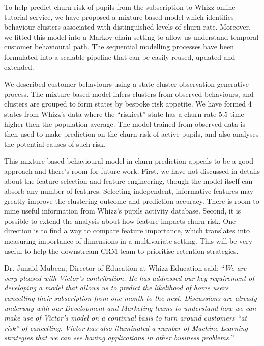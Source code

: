 \documentclass[english,a4,oneside,9pt]{extarticle}
\begin{document}
To help predict churn risk of pupils from the subscription to Whizz online tutorial service, we have proposed a mixture based model which identifies behaviour clusters associated with distinguished levels of churn rate. Moreover, we fitted this model into a Markov chain setting to allow us understand temporal customer behavioural path. The sequential modelling processes have been formulated into a scalable pipeline that can be easily reused, updated and extended.

We described customer behaviours using a state-cluster-observation generative process. The mixture based model infers clusters from observed behaviours, and clusters are grouped to form states by bespoke risk appetite. We have formed 4 states from Whizz's data where the ``riskiest'' state has a churn rate 5.5 time higher then the population average. The model trained from observed data is then used to make prediction on the churn risk of active pupils, and also analyses the potential causes of such risk.

This mixture based behavioural model in churn prediction appeals to be a good approach and there's room for future work. First, we have not discussed in details about the feature selection and feature engineering, though the model itself can absorb any number of features. Selecting independent, informative features may greatly improve the clustering outcome and prediction accuracy. There is room to mine useful information from Whizz's pupils activity database. Second, it is possible to extend the analysis about how feature impacts churn risk. One direction is to find a way to compare feature importance, which translates into measuring importance of dimensions in a multivariate setting. This will be very useful to help the downstream CRM team to prioritise retention strategies.  

Dr. Junaid Mubeen, Director of Education at Whizz Education said: ``\emph{We are very pleased with Victor's contribution. He has addressed our key requirement of developing a model that allows us to predict the likelihood of home users cancelling their subscription from one month to the next. Discussions are already underway with our Development and Marketing teams to understand how we can make use of Victor's model on a continual basis to turn around customers ``at risk'' of cancelling. Victor has also illuminated a number of Machine Learning strategies that we can see having applications in other business problems.}''


%
\end{document}
